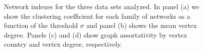 \documentclass[12pt]{article}
\begin{document}
\begin{center}
\begin{figure}[]
\begin{center}
\end{center}
\caption{\footnotesize Network indexes for the three data sets analyzed.
In panel (a) we show the clustering coefficient for each family of networks as a function of the threshold $\sigma$ and panel (b) shows the mean vertex degree.
Panels (c) and (d) show graph assortativity by vertex country and vertex degree, respectively.}
\label{fig:indexes}
\end{figure}
\end{center}
\end{document}
